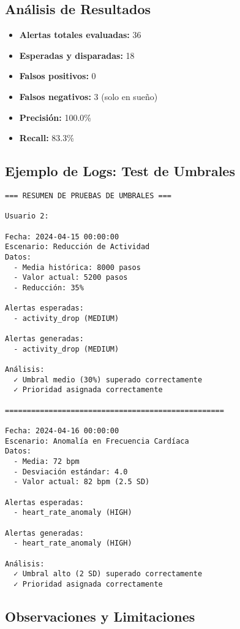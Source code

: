 \subsection{Análisis de Resultados}

\begin{itemize}
    \item \textbf{Alertas totales evaluadas:} 36
    \item \textbf{Esperadas y disparadas:} 18
    \item \textbf{Falsos positivos:} 0
    \item \textbf{Falsos negativos:} 3 (solo en sueño)
    \item \textbf{Precisión:} 100.0\%
    \item \textbf{Recall:} 83.3\%
\end{itemize}

\subsection{Ejemplo de Logs: Test de Umbrales}

\begin{verbatim}
=== RESUMEN DE PRUEBAS DE UMBRALES ===

Usuario 2:

Fecha: 2024-04-15 00:00:00
Escenario: Reducción de Actividad
Datos:
  - Media histórica: 8000 pasos
  - Valor actual: 5200 pasos
  - Reducción: 35%

Alertas esperadas:
  - activity_drop (MEDIUM)

Alertas generadas:
  - activity_drop (MEDIUM)

Análisis:
  ✓ Umbral medio (30%) superado correctamente
  ✓ Prioridad asignada correctamente

==================================================

Fecha: 2024-04-16 00:00:00
Escenario: Anomalía en Frecuencia Cardíaca
Datos:
  - Media: 72 bpm
  - Desviación estándar: 4.0
  - Valor actual: 82 bpm (2.5 SD)

Alertas esperadas:
  - heart_rate_anomaly (HIGH)

Alertas generadas:
  - heart_rate_anomaly (HIGH)

Análisis:
  ✓ Umbral alto (2 SD) superado correctamente
  ✓ Prioridad asignada correctamente
\end{verbatim}

\subsection{Observaciones y Limitaciones}

